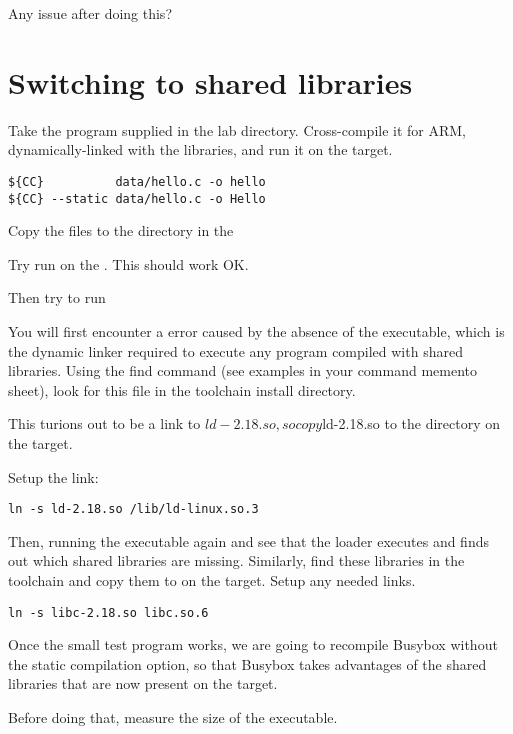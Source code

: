 Any issue after doing this?

\section{Switching to shared libraries}

Take the  program supplied in the lab 
directory. Cross-compile it for ARM, dynamically-linked with the
libraries, and run it on the target.

\begin{verbatim}
${CC}          data/hello.c -o hello
${CC} --static data/hello.c -o Hello
\end{verbatim}

Copy the files to the  directory in the   

Try run  on the \devboard. This should work OK.

Then try to run 

You will first encounter a  error caused by the absence of
the  executable, which is the dynamic linker
required to execute any program compiled with shared libraries. Using
the find command (see examples in your command memento sheet), look
for this file in the toolchain install directory.

This turions out to be a link to ${ld-2.18.so}, so copy ${ld-2.18.so}
to the  directory on the target.

Setup the link:

\begin{verbatim}
ln -s ld-2.18.so /lib/ld-linux.so.3
\end{verbatim}

Then, running the executable again and see that the loader executes
and finds out which shared libraries are missing. Similarly, find
these libraries in the toolchain and copy them to  on the
target. Setup any needed links.

\begin{verbatim}
ln -s libc-2.18.so libc.so.6
\end{verbatim}

Once the small test program works, we are going to recompile Busybox
without the static compilation option, so that Busybox takes advantages of the
shared libraries that are now present on the target.

Before doing that, measure the size of the  executable.


